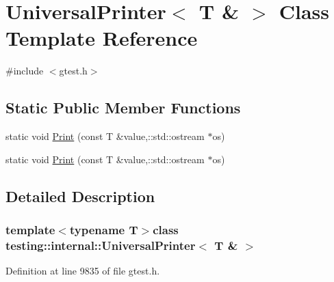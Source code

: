 \hypertarget{classtesting_1_1internal_1_1UniversalPrinter_3_01T_01_6_01_4}{\section{\-Universal\-Printer$<$ \-T \& $>$ \-Class \-Template \-Reference}
\label{db/d6e/classtesting_1_1internal_1_1UniversalPrinter_3_01T_01_6_01_4}
}


{\ttfamily \#include $<$gtest.\-h$>$}

\subsection*{\-Static \-Public \-Member \-Functions}
\begin{DoxyCompactItemize}
\item 
static void \hyperlink{classtesting_1_1internal_1_1UniversalPrinter_3_01T_01_6_01_4_a8db16abe866b095dc7d56db72ac2b99b}{\-Print} (const \-T \&value,\-::std\-::ostream $\ast$os)
\item 
static void \hyperlink{classtesting_1_1internal_1_1UniversalPrinter_3_01T_01_6_01_4_a8db16abe866b095dc7d56db72ac2b99b}{\-Print} (const \-T \&value,\-::std\-::ostream $\ast$os)
\end{DoxyCompactItemize}


\subsection{\-Detailed \-Description}
\subsubsection*{template$<$typename T$>$class testing\-::internal\-::\-Universal\-Printer$<$ T \& $>$}



\-Definition at line 9835 of file gtest.\-h.



